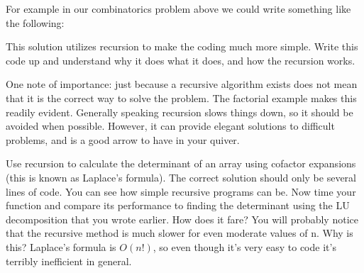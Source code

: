 For example in our combinatorics problem above we could write something like the following:



This solution utilizes recursion to make the coding much more simple. Write this code up and understand why it does what it does, and how the recursion works.

One note of importance: just because a recursive algorithm exists does not mean that it is the correct way to solve the problem. The factorial example makes this readily evident. Generally speaking recursion slows things down, so it should be avoided when possible. However, it can provide elegant solutions to difficult problems, and is a good arrow to have in your quiver.

\begin{problem}
Use recursion to calculate the determinant of an array using cofactor expansions (this is known as Laplace's formula). The correct solution should only be several lines of code. You can see how simple recursive programs can be. Now time your function and compare its performance to finding the determinant using the LU decomposition that you wrote earlier. How does it fare? You will probably notice that the recursive method is much slower for even moderate values of n. Why is this? Laplace's formula is $O(n!)$, so even though it's very easy to code it's terribly inefficient in general.
\end{problem}

